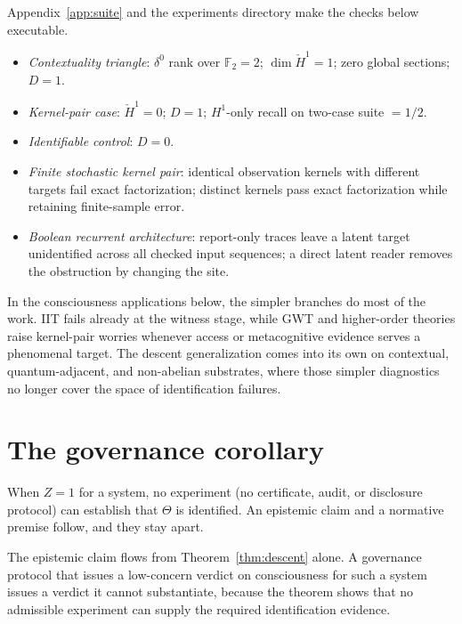 \documentclass[11pt]{article}
\begin{document}
Appendix~\ref{app:suite} and the experiments directory make the checks below
executable.
\begin{itemize}
\item \textit{Contextuality triangle}: $\delta^0$ rank over $\mathbb{F}_2 = 2$;
  $\dim\check{H}^1 = 1$; zero global sections; $D = 1$.
\item \textit{Kernel-pair case}: $\check{H}^1 = 0$; $D = 1$;
  $H^1$-only recall on two-case suite $= 1/2$.
\item \textit{Identifiable control}: $D = 0$.
\item \textit{Finite stochastic kernel pair}: identical observation kernels
with different targets fail exact factorization; distinct kernels pass exact
factorization while retaining finite-sample error.
\item \textit{Boolean recurrent architecture}: report-only traces leave a
latent target unidentified across all checked input sequences; a direct latent
reader removes the obstruction by changing the site.
\end{itemize}

In the consciousness applications below, the simpler branches do most of the
work. IIT fails already at the witness stage, while GWT and higher-order
theories raise kernel-pair worries whenever access or metacognitive evidence
serves a phenomenal target. The descent generalization
comes into its own on contextual, quantum-adjacent, and non-abelian substrates,
where those simpler diagnostics no longer cover the space of identification
failures.

\section{The governance corollary}
\label{sec:governance}

When $Z = 1$ for a system, no experiment (no certificate, audit, or disclosure
protocol) can establish that $\Theta$ is identified. An epistemic claim and a
normative premise follow, and they stay apart.

The epistemic claim flows from Theorem~\ref{thm:descent} alone. A
governance protocol that issues a low-concern verdict on consciousness for such
a system issues a verdict it cannot substantiate, because the theorem shows that
no admissible experiment can supply the required identification evidence.
\end{document}
